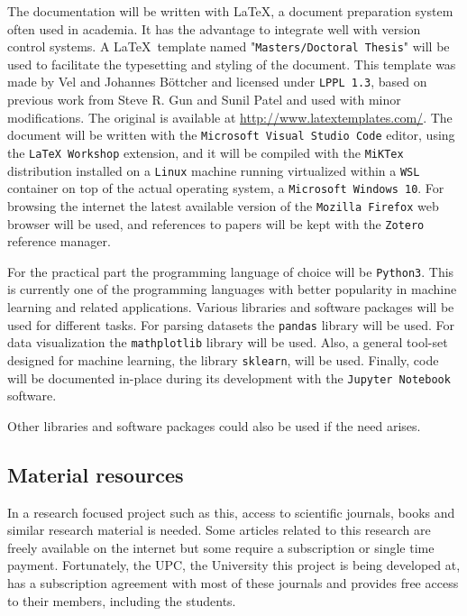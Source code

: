 The documentation will be written with \LaTeX, a document preparation system often used in academia. It has the advantage to integrate well with version control systems. A \LaTeX \ template named "\texttt{Masters/Doctoral Thesis}" will be used to facil\-itate the type\-setting and styling of the document. This template was made by Vel and Johannes Böttcher and licensed under \texttt{LPPL 1.3}, based on previous work from Steve R. Gun and Sunil Patel and used with minor modifications. The original is available at \url{http://www.latextemplates.com/}. The document will be written with the \texttt{Microsoft Visual Studio Code} editor, using the \texttt{LaTeX Workshop} extension, and it will be compiled with the \texttt{MiKTex} distribution installed on a \texttt{Linux} machine run\-ning virtualized within a \texttt{WSL} container on top of the actual operating system, a \texttt{Microsoft Windows 10}. For browsing the internet the latest available version of the \texttt{Mozilla Firefox} web browser will be used, and references to papers will be kept with the \texttt{Zotero} reference manager.

For the practical part the programming language of choice will be \texttt{Python3}. This is currently one of the programming languages with better popularity in machine learning and related applications. Various libraries and software packages will be used for different tasks. For parsing datasets the \texttt{pandas} library will be used. For data visualization the \texttt{mathplotlib} library will be used. Also, a general tool-set designed for machine learning, the library \texttt{sklearn}, will be used. Finally, code will be documented in-place during its development with the \texttt{Jupyter Notebook} software.

Other libraries and software packages could also be used if the need arises. 

\subsection{Material resources}

In a research focused project such as this, access to scientific journals, books and similar research material is needed. Some articles related to this research are freely available on the internet but some require a subscription or single time payment. Fortunately, the UPC, the University this project is being developed at, has a sub\-script\-ion agree\-ment with most of these journals and provides free access to their members, including the students.


